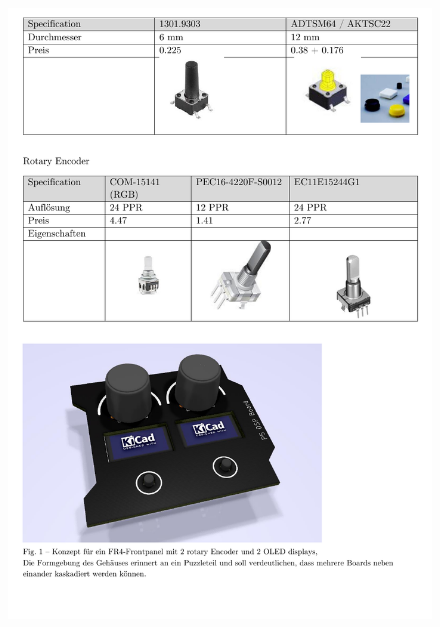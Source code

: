 \begin{appendix}
\begin{figure}[h]
	\centering
	\includegraphics[width=0.95\linewidth]{appendix/pflichtenheft(5).pdf}
\end{figure}


\end{appendix}
